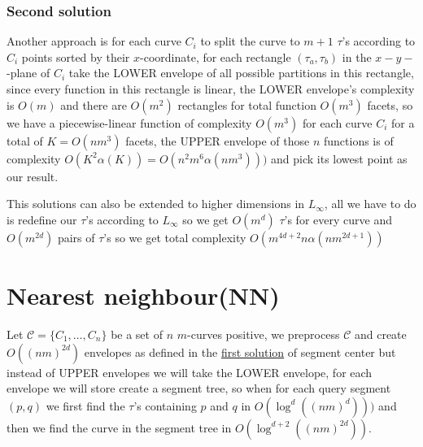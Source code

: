 \documentclass{article}
\theoremstyle{remark}
\theoremstyle{definition}
\begin{document}
\subsubsection{Second solution}
Another approach is for each curve $C_i$ to split the curve to $m+1$ $\tau$'s according to $C_i$ points sorted by their $x$-coordinate, for each rectangle $(\tau_a, \tau_b)$ in the $x-y-$-plane of $C_i$ take the LOWER envelope of all possible partitions in this rectangle, since every function in this rectangle is linear, the LOWER envelope's complexity is $O(m)$ and there are $O(m^2)$ rectangles for total function $O(m^3)$ facets, so we have a piecewise-linear function of complexity $O(m^3)$ for each curve $C_i$ for a total of $K=O(n m^3)$ facets, the UPPER envelope of those $n$ functions is of complexity $O(K^2\alpha(K))=O(n^2 m^6\alpha(n m^3)))$ and pick its lowest point as our result.

This solutions can also be extended to higher dimensions in $L_\infty$, all we have to do is redefine our $\tau$'s according to $L_\infty$ so we get $O(m^d)$ $\tau$'s for every curve and $O(m^{2d})$ pairs of $\tau$'s so we get total complexity $O(m^{4d + 2} n \alpha(n m^{2d + 1}))$


\section{Nearest neighbour(NN)}
Let $\mathcal{C} = \{C_1,\ldots,C_n\}$ be a set of $n$ $m$-curves positive, we preprocess $\mathcal{C}$ and create $O((n m)^{2d})$ envelopes as defined in the \hyperref[firstsolotion]{first solution} of segment center but instead of UPPER envelopes we will take the LOWER envelope, for each envelope we will store create a segment tree, so when for each query segment $(p,q)$ we first find the $\tau$'s containing $p$ and $q$ in $O(\log^{d} ((n m)^{d})))$ and then we find the curve in the segment tree in $O(\log^{d+2} ((n m)^{2d}))$.


\end{document}
